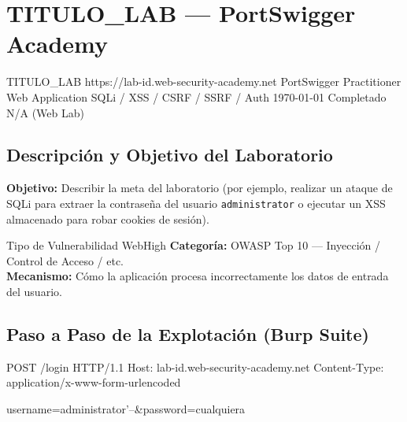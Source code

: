 \documentclass[../../../main_compilation.tex]{subfiles}
\begin{document}
\section[PortSwigger - TITULO\_LAB]{TITULO\_LAB — PortSwigger Academy}
\label{sec:portswigger-titulo-lab}

\targetSummary%
{TITULO\_LAB}%
{https://lab-id.web-security-academy.net}%
{PortSwigger}%
{Practitioner}%
{Web Application}%
{SQLi / XSS / CSRF / SSRF / Auth}%
{\today}%
{Completado}%
{N/A (Web Lab)}%

\vspace{0.4cm}

\subsection{Descripción y Objetivo del Laboratorio}
\textbf{Objetivo:} Describir la meta del laboratorio (por ejemplo, realizar un ataque de SQLi para extraer la contraseña del usuario \texttt{administrator} o ejecutar un XSS almacenado para robar cookies de sesión).

\begin{vulnbox}{Tipo de Vulnerabilidad Web}{High}
	\textbf{Categoría:} OWASP Top 10 — Inyección / Control de Acceso / etc.\\
	\textbf{Mecanismo:} Cómo la aplicación procesa incorrectamente los datos de entrada del usuario.
\end{vulnbox}

\subsection{Paso a Paso de la Explotación (Burp Suite)}

\begin{terminal}
	POST /login HTTP/1.1
	Host: lab-id.web-security-academy.net
	Content-Type: application/x-www-form-urlencoded

	username=administrator'--&password=cualquiera
\end{terminal}
\end{document}
